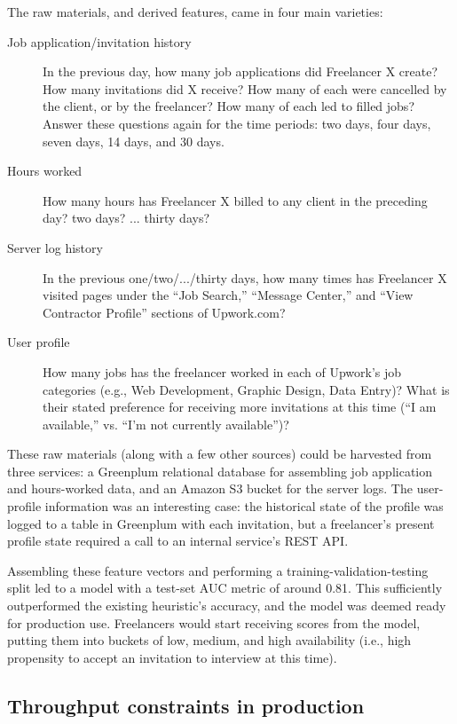 \documentclass{article}
\begin{document}
The raw materials, and derived features, came in four main varieties:

\begin{description}
 \item[Job application/invitation history] In the previous day, how many job
applications did Freelancer X create? How many invitations did X receive? How
many of each were cancelled by the client, or by the freelancer? How many of
each led to filled jobs? Answer these questions again for the time periods: two
days, four days, seven days, 14 days, and 30 days.
 \item[Hours worked] How many hours has Freelancer X billed to any client in the
preceding day? two days? ... thirty days?
 \item[Server log history] In the previous one/two/.../thirty days, how many
times has Freelancer X visited pages under the ``Job Search,'' ``Message
Center,'' and ``View Contractor Profile'' sections of Upwork.com?
 \item[User profile] How many jobs has the freelancer worked in each of Upwork's
job categories (e.g., Web Development, Graphic Design, Data Entry)? What is
their stated preference for receiving more invitations at this time (``I am
available,'' vs. ``I'm not currently available'')?
\end{description}

 These raw materials (along with a few other sources) could be harvested from
three services: a Greenplum relational database for assembling job application
and hours-worked data, and an Amazon S3 bucket for the server logs. The
user-profile information was an interesting case: the historical state of the
profile was logged to a table in Greenplum with each invitation, but a
freelancer's present profile state required a call to an internal service's REST
API.

 Assembling these feature vectors and performing a training-validation-testing
split led to a model with a test-set AUC metric of around 0.81. This
sufficiently outperformed the existing heuristic's accuracy, and the model was
deemed ready for production use. Freelancers would start receiving scores from
the model, putting them into buckets of low, medium, and high availability
(i.e., high propensity to accept an invitation to interview at this time).

\subsection{Throughput constraints in production}
\end{document}
